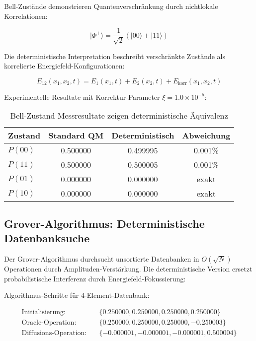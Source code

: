 \documentclass[12pt,a4paper]{report}
\begin{document}
	Bell-Zustände demonstrieren Quantenverschränkung durch nichtlokale Korrelationen:
	
	\begin{equation}
		|\Phi^+\rangle = \frac{1}{\sqrt{2}}(|00\rangle + |11\rangle)
	\end{equation}
	
	Die deterministische Interpretation beschreibt verschränkte Zustände als korrelierte Energiefeld-Konfigurationen:
	
	\begin{equation}
		E_{12}(x_1,x_2,t) = E_1(x_1,t) + E_2(x_2,t) + E_{\text{korr}}(x_1,x_2,t)
	\end{equation}
	
	Experimentelle Resultate mit Korrektur-Parameter $\xi = 1.0 \times 10^{-5}$:
	
	\begin{table}[htbp]
		\centering
		\begin{tabular}{lccc}
			\toprule
			\textbf{Zustand} & \textbf{Standard QM} & \textbf{Deterministisch} & \textbf{Abweichung} \\
			\midrule
			$P(00)$ & 0.500000 & 0.499995 & 0.001\% \\
			$P(11)$ & 0.500000 & 0.500005 & 0.001\% \\
			$P(01)$ & 0.000000 & 0.000000 & exakt \\
			$P(10)$ & 0.000000 & 0.000000 & exakt \\
			\bottomrule
		\end{tabular}
		\caption{Bell-Zustand Messresultate zeigen deterministische Äquivalenz}
	\end{table}
	
	\subsection{Grover-Algorithmus: Deterministische Datenbanksuche}
	
	Der Grover-Algorithmus durchsucht unsortierte Datenbanken in $O(\sqrt{N})$ Operationen durch Amplituden-Verstärkung. Die deterministische Version ersetzt probabilistische Interferenz durch Energiefeld-Fokussierung:
	
	Algorithmus-Schritte für 4-Element-Datenbank:
	
	\begin{align}
		\text{Initialisierung:} \quad &\{0.250000, 0.250000, 0.250000, 0.250000\} \\
		\text{Oracle-Operation:} \quad &\{0.250000, 0.250000, 0.250000, -0.250003\} \\
		\text{Diffusions-Operation:} \quad &\{-0.000001, -0.000001, -0.000001, 0.500004\}
	\end{align}
	
\end{document}
